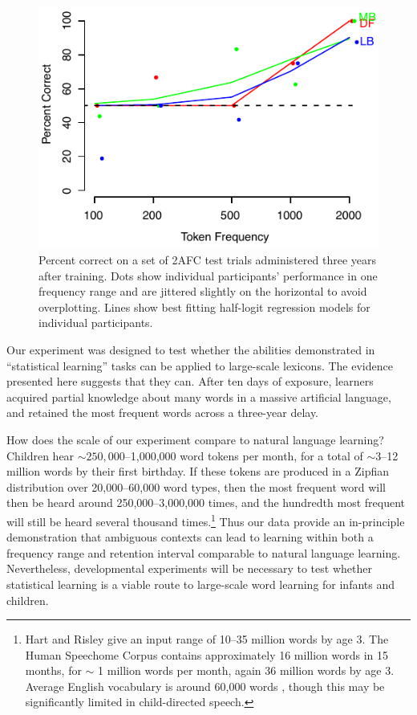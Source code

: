 \documentclass[10pt]{article}
\begin{document}
\begin{figure}[t]
\begin{center}
\includegraphics{figures/mseg2afc_col.pdf}
\caption{\label{fig:2afc} Percent correct on a set of 2AFC test trials administered three years after training. Dots show individual participants' performance in one frequency range and are jittered slightly on the horizontal to avoid overplotting. Lines show best fitting half-logit regression models for individual participants.}
\end{center}
\end{figure}

Our experiment was designed to test whether the abilities demonstrated in ``statistical learning'' tasks can be applied to large-scale lexicons. The evidence presented here suggests that they can. After ten days of exposure, learners acquired partial knowledge about many words in a massive artificial language, and retained the most frequent words across a three-year delay.

How does the scale of our experiment compare to natural language learning? Children hear $\sim250,000$--1,000,000 word tokens per month, for a total of $\sim3$--12 million words by their first birthday. If these tokens are produced in a Zipfian distribution over 20,000--60,000 word types, then the most frequent word will then be heard around 250,000--3,000,000 times, and the hundredth most frequent will still be heard several thousand times.\footnote{Hart and Risley \cite{hart1995} give an input range of 10--35 million words by age 3. The Human Speechome Corpus \cite{roy2009} contains approximately 16 million words in 15 months, for $\sim$ 1 million words per month, again 36 million words by age 3. Average English vocabulary is around 60,000 words \cite{pinker1994}, though this may be significantly limited in child-directed speech.} Thus our data provide an in-principle demonstration that ambiguous contexts can lead to learning within both a frequency range and retention interval comparable to natural language learning. Nevertheless, developmental experiments will be necessary to test whether statistical learning is a viable route to large-scale word learning for infants and children.
\end{document}
